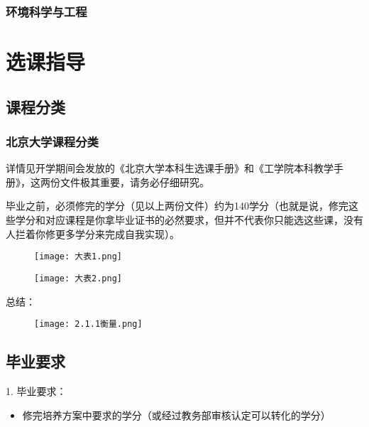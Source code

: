 \documentclass[11pt,oneside]{book}
\begin{document}
\subsection{环境科学与工程}

\newpage









\chapter{选课指导}
\section{课程分类}
\subsection{北京大学课程分类}
详情见开学期间会发放的《北京大学本科生选课手册》和《工学院本科教学手册》，这两份文件极其重要，请务必仔细研究。

毕业之前，必须修完的学分（见以上两份文件）约为140学分（也就是说，修完这些学分和对应课程是你拿毕业证书的必然要求，但并不代表你只能选这些课，没有人拦着你修更多学分来完成自我实现）。

\begin{figure}[htbp]
    \centering
    \texttt{[image: 大表1.png]}
\end{figure}

\begin{figure}[htbp]
    \centering
    \texttt{[image: 大表2.png]}
\end{figure}



总结：
\begin{figure}[htbp]
    \centering
    \texttt{[image: 2.1.1衡量.png]}
\end{figure}

\section{毕业要求}
1. 毕业要求：

\begin{itemize}
    \item 修完培养方案中要求的学分（或经过教务部审核认定可以转化的学分）
\end{itemize}
\end{document}
